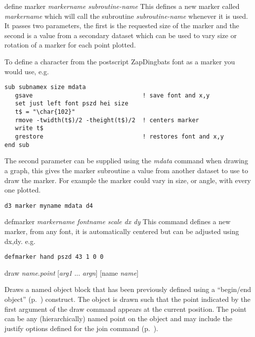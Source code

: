 \begin{commanddescription}
\item[{\sf define marker {\it markername  subroutine-name}}]
This defines a new marker called {\it markername} which will call
the subroutine {\it subroutine-name} whenever it is used.  It
passes two parameters, the first is the requested size of the
marker and the second is a value from a secondary dataset which
can be used to vary size or rotation of a marker for each point plotted.

To define a character from the postscript ZapDingbats font as a marker you
would use, e.g.

\begin{Verbatim}
sub subnamex size mdata
   gsave                               ! save font and x,y
   set just left font pszd hei size
   t$ = "\char{102}"
   rmove -twidth(t$)/2 -theight(t$)/2  ! centers marker
   write t$
   grestore                            ! restores font and x,y
end sub
\end{Verbatim}

The second parameter can be supplied using the {\it mdata} command
when drawing a graph,  this gives the marker subroutine a
value from another dataset to use to draw the marker.  For
example the marker could vary in size, or angle, with every
one plotted.

\begin{Verbatim}
d3 marker myname mdata d4
\end{Verbatim}

\item[{\sf defmarker {\it markername  fontname scale dx dy}}]
This command defines a new marker, from any font, it is
automatically centered but can be adjusted using dx,dy. e.g.

\begin{Verbatim}
defmarker hand pszd 43 1 0 0
\end{Verbatim}

\item[{\sf draw {\it name.point} [{\it arg1} ... {\it argn}] [name {\it name}]}]
\label{cmd:draw}

Draws a named object block that has been previously defined using a ``begin/end object'' (p.~\pageref{cmd:beginobject}) construct. The object is drawn such that the point indicated by the first argument of the draw command appears at the current position. The point can be any (hierarchically) named point on the object and may include the justify options defined for the join command (p.~\pageref{cmd:join}).


\end{commanddescription}
